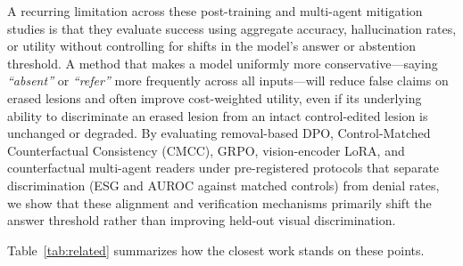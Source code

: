 \documentclass{article} %
\begin{document}
A recurring limitation across these post-training and multi-agent mitigation studies is that they evaluate success using aggregate accuracy, hallucination rates, or utility without controlling for shifts in the model's answer or abstention threshold. A method that makes a model uniformly more conservative---saying \emph{``absent''} or \emph{``refer''} more frequently across all inputs---will reduce false claims on erased lesions and often improve cost-weighted utility, even if its underlying ability to discriminate an erased lesion from an intact control-edited lesion is unchanged or degraded. By evaluating removal-based DPO, Control-Matched Counterfactual Consistency (CMCC), GRPO, vision-encoder LoRA, and counterfactual multi-agent readers under pre-registered protocols that separate discrimination (ESG and AUROC against matched controls) from denial rates, we show that these alignment and verification mechanisms primarily shift the answer threshold rather than improving held-out visual discrimination.

Table~\ref{tab:related} summarizes how the closest work stands on these points.
\end{document}
